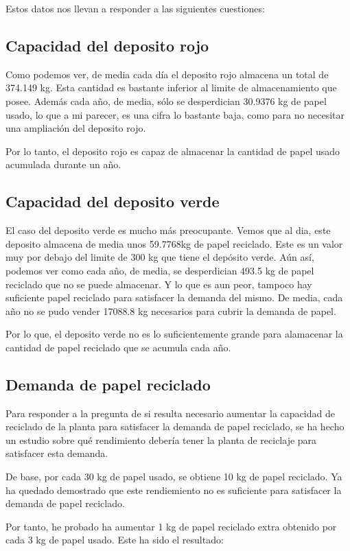 Estos datos nos llevan a responder a las siguientes cuestiones:

\subsection{Capacidad del deposito rojo}
Como podemos ver, de media cada día el deposito rojo almacena un total de 374.149 kg. Esta cantidad es bastante inferior al limite de almacenamiento que posee. Además cada año, de media, sólo se desperdician 30.9376 kg de papel usado, lo que a mi parecer, es una cifra lo bastante baja, como para no necesitar una ampliación del deposito rojo.

Por lo tanto, el deposito rojo es capaz de almacenar la cantidad de papel usado acumulada durante un año.

\subsection{Capacidad del deposito verde}
El caso del deposito verde es mucho más preocupante. Vemos que al dia, este deposito almacena de media unos 59.7768kg de papel reciclado. Este es un valor muy por debajo del limite de 300 kg que tiene el depósito verde. Aún así, podemos ver como cada año, de media, se desperdician 493.5 kg de papel reciclado que no se puede almacenar.
Y lo que es aun peor, tampoco hay suficiente papel reciclado para satisfacer la demanda del mismo. De media, cada año no se pudo vender 17088.8 kg necesarios para cubrir la demanda de papel.

Por lo que, el deposito verde no es lo suficientemente grande para alamacenar la cantidad de papel reciclado que se acumula cada año.

\subsection{Demanda de papel reciclado}

Para responder a la pregunta de si resulta necesario aumentar la capacidad de reciclado de la planta para satisfacer la demanda de papel reciclado, se ha hecho un estudio sobre qué rendimiento debería tener la planta de reciclaje para satisfacer esta demanda.

De base, por cada 30 kg de papel usado, se obtiene 10 kg de papel reciclado. Ya ha quedado demostrado que este rendiemiento no es suficiente para satisfacer la demanda de papel reciclado.

Por tanto, he probado ha aumentar 1 kg de papel reciclado extra obtenido por cada 3 kg de papel usado. Este ha sido el resultado:

